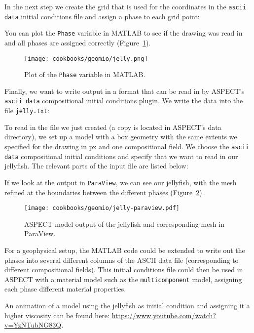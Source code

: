 \documentclass{article}
\newcommand{\aspect}{\textsc{ASPECT}}
\begin{document}
In the next step we create the grid that is used for the coordinates in the \texttt{ascii data} initial conditions file 
and assign a phase to each grid point: 

You can plot the \texttt{Phase} variable in MATLAB to see if the drawing was read in and all phases are assigned correctly 
(Figure~\ref{fig:jelly-plot}). 
\begin{figure}[tb]
    \centering
    \texttt{[image: cookbooks/geomio/jelly.png]}
    \caption{Plot of the \texttt{Phase} variable in MATLAB.}
    \label{fig:jelly-plot}
\end{figure}
Finally, we want to write output in a format that can be read in by \aspect{}'s \texttt{ascii data} compositional
initial conditions plugin. We write the data into the file \texttt{jelly.txt}:


To read in the file we just created (a copy is located in \aspect{}'s data directory), 
we set up a model with a box geometry with the same extents we specified for the drawing in px 
and one compositional field. We choose the \texttt{ascii data} compositional initial conditions and specify that we 
want to read in our jellyfish. The relevant parts of the input file are listed below:


If we look at the output in \texttt{ParaView}, we can see our jellyfish, with the mesh refined at the 
boundaries between the different phases (Figure~\ref{fig:jelly-paraview}). 
\begin{figure}[tb]
    \centering
    \texttt{[image: cookbooks/geomio/jelly-paraview.pdf]}
    \caption{\aspect{} model output of the jellyfish and corresponding mesh in ParaView.}
    \label{fig:jelly-paraview}
\end{figure}

For a geophysical setup, the MATLAB code could be extended to write out the phases into several different columns 
of the ASCII data file (corresponding to different compositional fields). This initial conditions file could then be 
used in \aspect{} with a material model such as the \texttt{multicomponent} model, assigning each phase different 
material properties. 

An animation of a model using the jellyfish as initial condition and assigning it a higher viscosity can be found here: \url{https://www.youtube.com/watch?v=YzNTubNG83Q}. 
\end{document}

